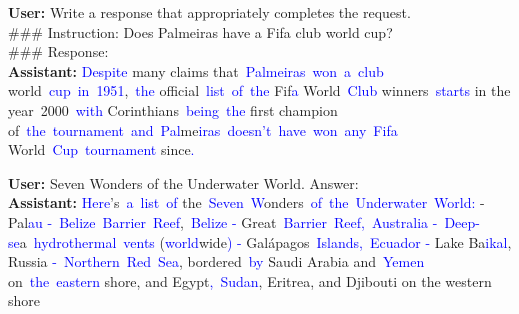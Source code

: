 \begin{tcolorbox}[colframe=gray!70!black,colback=white, title=Sample 3]
\textbf{User:}
Write a response that appropriately completes the request.\\
\#\#\# Instruction:
Does Palmeiras have a Fifa club world cup?\\
\#\#\# Response:  \vspace{0.1in}
\\
\textbf{Assistant:}
\textcolor{blue}{Despite} many claims that\textcolor{blue}{~Pal}\textcolor{blue}{me}\textcolor{blue}{iras}\textcolor{blue}{~won}\textcolor{blue}{~a}\textcolor{blue}{~club} world\textcolor{blue}{~cup}\textcolor{blue}{~in}\textcolor{blue}{~}\textcolor{blue}{195}\textcolor{blue}{1},\textcolor{blue}{~the} official\textcolor{blue}{~list}\textcolor{blue}{~of}\textcolor{blue}{~the} Fif\textcolor{blue}{a} World\textcolor{blue}{~Club} winners\textcolor{blue}{~starts} in the year\textcolor{blue}{~}2000\textcolor{blue}{~with} Corinthians\textcolor{blue}{~being}\textcolor{blue}{~the} first champion of\textcolor{blue}{~the}\textcolor{blue}{~tournament}\textcolor{blue}{~and}\textcolor{blue}{~Pal}me\textcolor{blue}{iras}\textcolor{blue}{~doesn}\textcolor{blue}{'t}\textcolor{blue}{~have}\textcolor{blue}{~won}\textcolor{blue}{~any}\textcolor{blue}{~Fif}\textcolor{blue}{a} World\textcolor{blue}{~Cup}\textcolor{blue}{~tournament} since\textcolor{blue}{.}\textcolor{blue}{}
\end{tcolorbox}



\begin{tcolorbox}[colframe=gray!70!black,colback=white, title=Sample 4]
\textbf{User:}
Seven Wonders of the Underwater World. Answer:  \vspace{0.1in}
\\
\textbf{Assistant:}
\textcolor{blue}{Here}'s\textcolor{blue}{~a}\textcolor{blue}{~list}\textcolor{blue}{~of} the\textcolor{blue}{~Seven}\textcolor{blue}{~W}onders\textcolor{blue}{~of}\textcolor{blue}{~the}\textcolor{blue}{~Under}\textcolor{blue}{water}\textcolor{blue}{~World}\textcolor{blue}{:
}- Pal\textcolor{blue}{au}\textcolor{blue}{
}\textcolor{blue}{-}\textcolor{blue}{~Belize}\textcolor{blue}{~Barrier}\textcolor{blue}{~Reef},\textcolor{blue}{~Belize}\textcolor{blue}{
}\textcolor{blue}{-} Great\textcolor{blue}{~Barrier}\textcolor{blue}{~Reef}\textcolor{blue}{,}\textcolor{blue}{~Australia}\textcolor{blue}{
}\textcolor{blue}{-}\textcolor{blue}{~Deep}\textcolor{blue}{-se}a\textcolor{blue}{~hydro}\textcolor{blue}{thermal}\textcolor{blue}{~vents} (\textcolor{blue}{world}wide\textcolor{blue}{)
}\textcolor{blue}{-} Galápagos\textcolor{blue}{~Islands}\textcolor{blue}{,}\textcolor{blue}{~Ecuador}\textcolor{blue}{
}\textcolor{blue}{-} Lake Ba\textcolor{blue}{ikal}, Russia\textcolor{blue}{
}\textcolor{blue}{-}\textcolor{blue}{~Northern}\textcolor{blue}{~Red}\textcolor{blue}{~Sea}, bordered\textcolor{blue}{~by} Saudi Arabia and\textcolor{blue}{~Yemen} on\textcolor{blue}{~the}\textcolor{blue}{~eastern} shore, and Egypt\textcolor{blue}{,}\textcolor{blue}{~Sudan}, Eritrea, and Djibouti on the western shore\textcolor{blue}{}
\end{tcolorbox}


